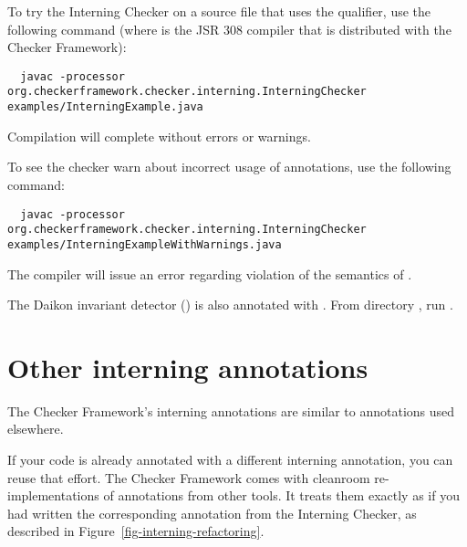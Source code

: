 To try the Interning Checker on a source file that uses the  qualifier,
use the following command (where  is the JSR 308 compiler that
is distributed with the Checker Framework):

\begin{Verbatim}
  javac -processor org.checkerframework.checker.interning.InterningChecker examples/InterningExample.java
\end{Verbatim}

\noindent
Compilation will complete without errors or warnings.

To see the checker warn about incorrect usage of annotations, use the following
command:

\begin{Verbatim}
  javac -processor org.checkerframework.checker.interning.InterningChecker examples/InterningExampleWithWarnings.java
\end{Verbatim}

\noindent
The compiler will issue an error regarding violation of the semantics of
.


The Daikon invariant detector
() is also annotated with
.  From directory ,
run .



\section{Other interning annotations\label{other-interning-annotations}}

The Checker Framework's interning annotations are similar to annotations used
elsewhere.

If your code is already annotated with a different interning
annotation, you can reuse that effort.  The Checker Framework comes with
cleanroom re-implementations of annotations from other tools.  It treats
them exactly as if you had written the corresponding annotation from the
Interning Checker, as described in Figure~\ref{fig-interning-refactoring}.


